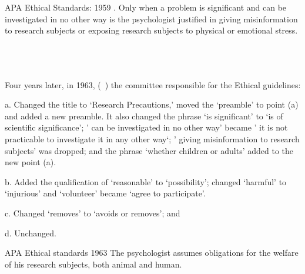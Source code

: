 \begin{refsection}
\begin{apatextbox}{APA Ethical Standards: 1959}\label{sample:APAEthics1959}
. Only when a problem is significant and can be investigated in no other way is the psychologist justified in giving misinformation to research subjects or exposing research subjects to physical or emotional stress.\\

\\

\\

\\
\end{apatextbox}

Four years later, in 1963, (~\citep{Association:1963uu}) the committee responsible for the Ethical guidelines:

a. Changed the title to `Research Precautions,’ moved the ‘preamble’ to point (a) and added a new preamble. It also changed the phrase `is significant' to `is of scientific significance'; ' can be investigated in no other way' became ' it is not practicable to investigate it in any other way`; ' giving misinformation to research subjects' was dropped; and the phrase `whether children or adults' added to the new point (a).

b. Added the qualification of `reasonable' to `possibility'; changed `harmful' to `injurious' and `volunteer' became `agree to participate'. 

c. Changed `removes' to `avoids or removes'; and 

d. Unchanged.

\begin{apatextbox}{APA Ethical standards 1963}
\label{sample: APAEthics1963}
 The psychologist assumes obligations for the welfare of his research subjects, both animal and human.\\


\end{apatextbox}
\end{refsection}
